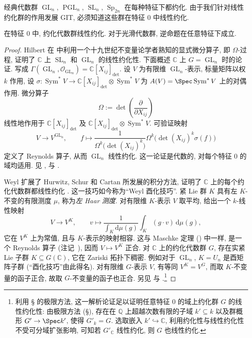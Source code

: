 经典代数群 $\operatorname{GL}_n$, $\operatorname{PGL}_n$, $\operatorname{SL}_n$, $\operatorname{Sp}_{2n}$ 在每种特征下都约化. 由于我们针对线性约化群的作用发展 GIT, 必须知道这些群在特征 $0$ 中线性约化.
\begin{theorem}\label{src:B.1.46}
在特征 $0$ 中, 约化代数群线性约化. 对于光滑代数群, 逆命题在任意特征下成立.
\end{theorem}
\begin{proof}
Hilbert 在 \cite{Hil90} 中利用一个十九世纪不变量论学者熟知的显式微分算子, 即 $\Omega$-过程, 证明了 $\mathbb C$ 上 $\operatorname{SL}_n$ 和 $\operatorname{GL}_n$ 的线性约化性. 下面概述 $\mathbb C$ 上 $G=\operatorname{GL}_n$ 时的论证. 写成 $\Gamma(\operatorname{GL}_n,\mathcal O_{\operatorname{GL}_n})=\mathbb C[X_{ij}]_{\det}$. 设 $V$ 为有限维 $\operatorname{GL}_n$-表示, 标量矩阵以权 $k$ 作用, 设 $\sigma:\operatorname{Sym}^*V\to\mathbb C[X_{ij}]_{\det}\otimes\operatorname{Sym}^*V$ 为 $\mathbb A(V)=\Spec\operatorname{Sym}^*V$ 上的对偶作用. 微分算子
\[
\Omega:=\det\left(\frac{\partial}{\partial X_{ij}}\right)
\]
线性地作用于 $\mathbb C[X_{ij}]_{\det}$ 及 $\mathbb C[X_{ij}]_{\det}\otimes\operatorname{Sym}^*V$. 可验证映射
\[
V\to V^{\operatorname{GL}_n},\qquad
f\mapsto\frac{1}{\Omega^k\bigl(\det(X_{ij})^k\bigr)}\Omega^k\bigl(\det(X_{ij})^k\sigma(f)\bigr)
\]
定义了 Reynolds 算子, 从而 $\operatorname{GL}_n$ 线性约化. 这一论证是代数的, 对每个特征 $0$ 的域均适用. 见 \cite[\S$4.3$]{Stu08}, \cite[\S$2.1$]{Dol03} 与 \cite[\S$4.5.3$]{DK15}.

Weyl 扩展了 Hurwitz, Schur 和 Cartan 所发展的积分方法, 证明了 $\mathbb C$ 上的每个约化代数群都线性约化 \cite{Wey26,Wey25}. 这一技巧如今称为``Weyl 酉化技巧''. 紧 Lie 群 $K$ 具有左 $K$-不变的有限测度 $\mu$, 称为\textit{左 Haar 测度}. 对有限维 $K$-表示 $V$ 取平均, 给出一个 $k$-线性映射
\[
V\to V^K,\qquad v\mapsto\frac{1}{\int_K\mathrm d\mu(g)}\int_K(g\cdot v)\,\mathrm d\mu(g),
\]
它在 $V^K$ 上为常值, 且与 $K$-表示的映射相容. 这与 Maschke 定理 () 中一样, 是一个 Reynolds 算子 (注记~), 因而 $V\mapsto V^K$ 正合. 对 $\mathbb C$ 上的约化代数群 $G$, 存在实紧 Lie 子群 $K\subseteq G(\mathbb C)$, 它在 Zariski 拓扑下稠密. 例如对于 $\operatorname{GL}_n$, $K=U_n$ 是酉矩阵子群 (``酉化技巧''由此得名). 对有限维 $G$-表示 $V$, 有等同 $V^K=V^G$, 而取 $K$-不变量的函子正合, 故取 $G$-不变量的函子也正合. 另见 \cite[\S$3.2$]{Dol03} 与 \cite[定理 $14.3$]{Bum13}.\footnote{利用 \S{} 的极限方法, 这一解析论证足以证明任意特征 $0$ 的域上约化群 $G$ 的线性约化性: 由极限方法 (\S{}), 存在在 $\mathbb Q$ 上超越次数有限的子域 $k'\subseteq k$ 以及群概形 $G'\to\Spec k'$, 使得 $G'_k=G$. 选取嵌入 $k'\hookrightarrow\mathbb C$, 利用约化性与线性约化性不受可分域扩张影响, 可知若 $G'_{\mathbb C}$ 线性约化, 则 $G$ 也线性约化.}


\end{proof}
